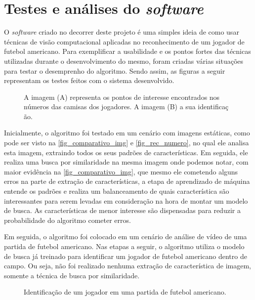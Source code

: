 \section{\textbf{Testes e análises do \textit{software}}}
\label{testes_do_software}
O \textit{software} criado no decorrer deste projeto é uma simples ideia de como usar técnicas de visão computacional aplicadas no reconhecimento de um jogador de futebol americano. Para exemplificar a usabilidade e os pontos fortes das técnicas utilizadas durante o desenvolvimento do mesmo, foram criadas várias situações para testar o desemprenho do algoritmo. Sendo assim, as figuras a seguir representam os testes feitos com o sistema desenvolvido.

\begin{figure}[ht]
	\caption{\label{fig_rec_numero}A imagem (A) representa os pontos de interesse encontrados nos números das camisas dos jogadores. A imagem (B) a sua identificaç ão.}
	\begin{center}
	\end{center}
	\centering {}
\end{figure}

Inicialmente, o algoritmo foi testado em um cenário com imagens estáticas, como pode ser visto na \autoref{fig_comparativo_img} e \autoref{fig_rec_numero}, no qual ele analisa esta imagem, extraindo todos os seus padrões de características. Em seguida, ele realiza uma busca por similaridade na mesma imagem onde podemos notar, com maior evidência na  \autoref{fig_comparativo_img}, que mesmo ele cometendo alguns erros na parte de extração de características, a etapa de aprendizado de máquina entende os padrões e realiza  um balanceamento de quais característica são interessantes para serem levadas em consideração na hora de montar um modelo de busca. As características de menor interesse são dispensadas para reduzir a probabilidade do algoritmo cometer erros.

Em seguida, o algoritmo foi colocado em um cenário de análise de vídeo de uma partida de futebol americano. Nas etapas a seguir, o algoritmo utiliza o modelo de busca já treinado para identificar um jogador de futebol americano dentro de campo. Ou seja, não foi realizado nenhuma extração de característica de imagem, somente a técnica de busca por similaridade.

\begin{figure}[ht]
	\caption{\label{fig_rep_jogador_em_campo}Identificação de um jogador em uma partida de futebol americano.}
	\begin{center}
	\end{center}
	\centering {}
\end{figure}

